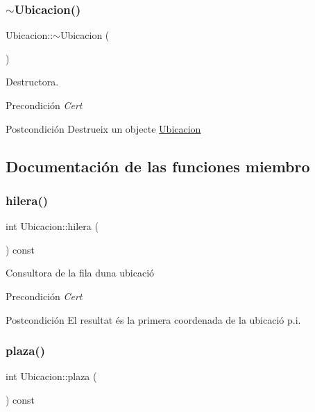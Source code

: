 \subsubsection{\texorpdfstring{$\sim$\+Ubicacion()}{~Ubicacion()}}
{\footnotesize\ttfamily Ubicacion\+::$\sim$\+Ubicacion (\begin{DoxyParamCaption}{ }\end{DoxyParamCaption})}



Destructora. 

\begin{DoxyPrecond}{Precondición}
{\itshape Cert} 
\end{DoxyPrecond}
\begin{DoxyPostcond}{Postcondición}
Destrueix un objecte \hyperlink{class_ubicacion}{Ubicacion} 
\end{DoxyPostcond}


\subsection{Documentación de las funciones miembro}
\mbox{\label{class_ubicacion_abf00d08075e75ac833de7357ebc6f521}} 
\subsubsection{\texorpdfstring{hilera()}{hilera()}}
{\footnotesize\ttfamily int Ubicacion\+::hilera (\begin{DoxyParamCaption}{ }\end{DoxyParamCaption}) const}



Consultora de la fila d\textquotesingle{}una ubicació 

\begin{DoxyPrecond}{Precondición}
{\itshape Cert} 
\end{DoxyPrecond}
\begin{DoxyPostcond}{Postcondición}
El resultat és la primera coordenada de la ubicació p.\+i. 
\end{DoxyPostcond}
\mbox{\label{class_ubicacion_abed323ffb2eace375e80bc395fdaeb39}} 
\subsubsection{\texorpdfstring{plaza()}{plaza()}}
{\footnotesize\ttfamily int Ubicacion\+::plaza (\begin{DoxyParamCaption}{ }\end{DoxyParamCaption}) const}



